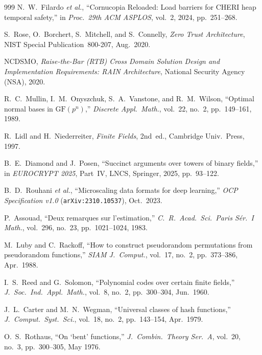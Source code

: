 \documentclass[11pt,letterpaper]{article}
\theoremstyle{spectralthm}
\begin{document}
\begin{thebibliography}{999}
N.~W.~Filardo \textit{et al.}, ``Cornucopia Reloaded: Load barriers for CHERI heap temporal safety,'' in \textit{Proc.\ 29th ACM ASPLOS}, vol.~2, 2024, pp.~251--268.

S.~Rose, O.~Borchert, S.~Mitchell, and S.~Connelly, \textit{Zero Trust Architecture}, NIST Special Publication~800-207, Aug.\ 2020.

NCDSMO, \textit{Raise-the-Bar (RTB) Cross Domain Solution Design and Implementation Requirements: RAIN Architecture}, National Security Agency (NSA), 2020.

R.~C.~Mullin, I.~M.~Onyszchuk, S.~A.~Vanstone, and R.~M.~Wilson, ``Optimal normal bases in $\mathrm{GF}(p^n)$,'' \textit{Discrete Appl.\ Math.}, vol.~22, no.~2, pp.~149--161, 1989.

R.~Lidl and H.~Niederreiter, \textit{Finite Fields}, 2nd~ed., Cambridge Univ.\ Press, 1997.

B.~E.~Diamond and J.~Posen, ``Succinct arguments over towers of binary fields,'' in \textit{EUROCRYPT 2025}, Part~IV, LNCS, Springer, 2025, pp.~93--122.

B.~D.~Rouhani \textit{et al.}, ``Microscaling data formats for deep learning,'' \textit{OCP Specification v1.0} (\texttt{arXiv:2310.10537}), Oct.\ 2023.

P.~Assouad, ``Deux remarques sur l'estimation,'' \textit{C.\ R.\ Acad.\ Sci.\ Paris S\'{e}r.\ I Math.}, vol.~296, no.~23, pp.~1021--1024, 1983.

M.~Luby and C.~Rackoff, ``How to construct pseudorandom permutations from pseudorandom functions,'' \textit{SIAM J.\ Comput.}, vol.~17, no.~2, pp.~373--386, Apr.\ 1988.

I.~S.~Reed and G.~Solomon, ``Polynomial codes over certain finite fields,'' \textit{J.\ Soc.\ Ind.\ Appl.\ Math.}, vol.~8, no.~2, pp.~300--304, Jun.\ 1960.

J.~L.~Carter and M.~N.~Wegman, ``Universal classes of hash functions,'' \textit{J.\ Comput.\ Syst.\ Sci.}, vol.~18, no.~2, pp.~143--154, Apr.\ 1979.

O.~S.~Rothaus, ``On `bent' functions,'' \textit{J.\ Combin.\ Theory Ser.\ A}, vol.~20, no.~3, pp.~300--305, May 1976.


\end{thebibliography}
\end{document}
